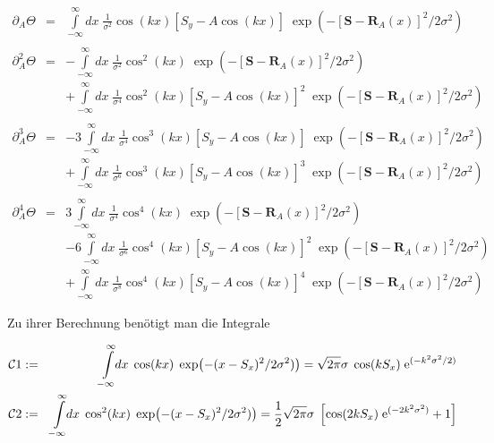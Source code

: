 \begin{small}
\begin{eqnarray*}
{\partial_A} \Theta &=&\int\limits_{-\infty}^{\infty}\!\!\!dx\; \frac{1}{\sigma^2} \cos(kx)\left[S_y-A\cos(kx)\right] \;\exp\!\left(-[\mathbf{S}-\mathbf{R}_A(x)]^2/2\sigma^2\right)\\
&&\\
{\partial^2_A}  \Theta &=& -\int\limits_{-\infty}^{\infty}\!\!\!dx\; \frac{1}{\sigma^2} \cos^2(kx) \;\exp\!\left(-[\mathbf{S}-\mathbf{R}_A(x)]^2/2\sigma^2\right) \\
&&+ \int\limits_{-\infty}^{\infty}\!\!\!dx\; \frac{1}{\sigma^4} \cos^2(kx)\left[S_y-A\cos(kx)\right]^2  \;\exp\!\left(-[\mathbf{S}-\mathbf{R}_A(x)]^2/2\sigma^2\right)\\
&&\\
{\partial^3_A}  \Theta &=& -3 \int\limits_{-\infty}^{\infty}\!\!\!dx\; \frac{1}{\sigma^4} \cos^3(kx) \left[S_y-A\cos(kx)\right] \;\exp\!\left(-[\mathbf{S}-\mathbf{R}_A(x)]^2/2\sigma^2\right) \\
&&+ \int\limits_{-\infty}^{\infty}\!\!\!dx\; \frac{1}{\sigma^6} \cos^3(kx) \left[S_y-A\cos(kx)\right]^3 \;\exp\!\left(-[\mathbf{S}-\mathbf{R}_A(x)]^2/2\sigma^2\right)\\
&&\\
{\partial^4_A}  \Theta &=& 3 \int\limits_{-\infty}^{\infty}\!\!\!dx\; \frac{1}{\sigma^4} \cos^4(kx) \;\exp\!\left(-[\mathbf{S}-\mathbf{R}_A(x)]^2/2\sigma^2\right) \\
&&- 6 \int\limits_{-\infty}^{\infty}\!\!\!dx\; \frac{1}{\sigma^6} \cos^4(kx) \left[S_y-A\cos(kx)\right]^2 \;\exp\!\left(-[\mathbf{S}-\mathbf{R}_A(x)]^2/2\sigma^2\right) \\
&&+\int\limits_{-\infty}^{\infty}\!\!\!dx\; \frac{1}{\sigma^8} \cos^4(kx) \left[S_y-A\cos(kx)\right]^4 \;\exp\!\left(-[\mathbf{S}-\mathbf{R}_A(x)]^2/2\sigma^2\right)
\end{eqnarray*}
\end{small}

\noindent Zu ihrer Berechnung benötigt man die Integrale

\begin{small}
\begin{eqnarray*}
{\cal C}1 &:=&\;\;\int\limits_{-\infty}^{\infty}\!\!dx\;\cos(kx)\;\exp\!\left(-(x-S_x)^2/2\sigma^2)\right)=\sqrt{2\pi}\sigma\;\cos(kS_x)\;{\rm e}^{(-k^2\sigma^2/2)}\\
{\cal C}2 &:=&\int\limits_{-\infty}^{\infty}\!\!dx\;\cos^2(kx)\;\exp\!\left(-(x-S_x)^2/2\sigma^2)\right)=\frac{1}{2}\sqrt{2\pi}\sigma\;\left[\cos(2kS_x)\;{\rm e}^{(-2k^2\sigma^2)}+1\right]
\end{eqnarray*}
\end{small}

